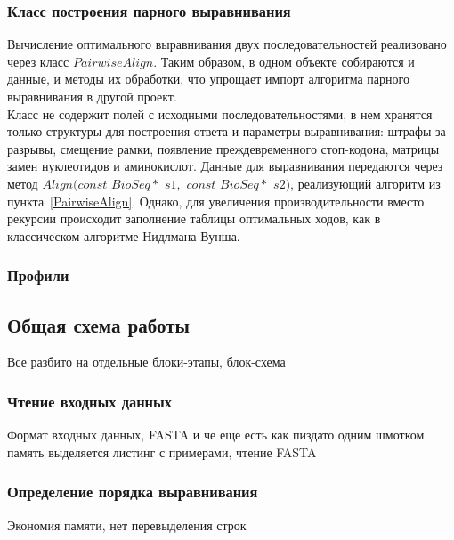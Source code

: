 \subsubsection[Класс построения парного выравнивания]{\large Класс построения парного выравнивания}
\hspace{\parindent} Вычисление оптимального выравнивания двух последовательностей реализовано через  класс $PairwiseAlign$. Таким образом, в одном объекте собираются и данные, и методы их обработки, что упрощает импорт алгоритма парного выравнивания в другой проект.\\
\indent Класс не содержит полей с исходными последовательностями, в нем хранятся только структуры для построения ответа и параметры выравнивания: штрафы за разрывы, смещение рамки, появление преждевременного стоп-кодона, матрицы замен нуклеотидов и аминокислот. Данные для выравнивания передаются через метод $Align(const$ $BioSeq*$ $s1,$ $const$ $BioSeq*$ $s2)$, реализующий алгоритм из пункта~\ref{PairwiseAlign}. Однако, для увеличения производительности вместо рекурсии происходит заполнение таблицы оптимальных ходов, как в классическом алгоритме Нидлмана-Вунша.

\subsubsection[Профили]{\large Профили}
\hspace{\parindent} 

\subsection[Общая схема работы]{\large Общая схема работы}
\hspace{\parindent} Все разбито на отдельные блоки-этапы, блок-схема

\subsubsection[Чтение входных данных]{\large Чтение входных данных}
\hspace{\parindent} Формат входных данных, FASTA и че еще есть
как пиздато одним шмотком память выделяется
листинг с примерами, чтение FASTA

\subsubsection[Определение порядка выравнивания]{\large Определение порядка выравнивания}
\hspace{\parindent} Экономия памяти, нет перевыделения строк

